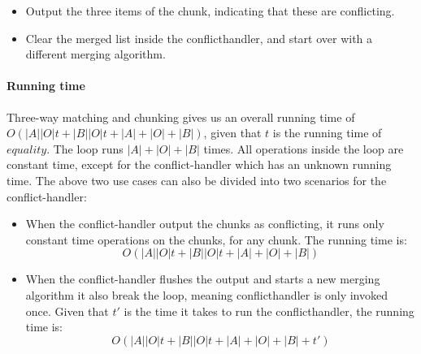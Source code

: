 \documentclass[11pt]{article}
\begin{document}
\begin{itemize}
   \item Output the three items of the chunk, indicating that these are conflicting.
   \item Clear the merged list inside the conflicthandler, and start over with a different merging algorithm.
\end{itemize}

\paragraph{Running time} Three-way matching and chunking gives us an overall running time of $O(|A||O| t + |B||O| t + |A|+|O|+|B|)$, given that $t$ is the running time of $equality$. The loop runs $|A|+|O|+|B|$ times. All operations inside the loop are constant time, except for the conflict-handler which has an unknown running time. The above two use cases can also be divided into two scenarios for the conflict-handler:

\begin{itemize}
	\item When the conflict-handler output the chunks as conflicting, it runs only constant time operations on the chunks, for any chunk. The running time is:\\
		\begin{equation}
			O(|A||O| t + |B||O| t + |A|+|O|+|B| ) \nonumber
		\end{equation}

	
	\item When the conflict-handler flushes the output and starts a new merging algorithm it also break the loop, meaning conflicthandler is only invoked once. Given that $t'$ is the time it takes to run the conflicthandler, the running time is:\\
		\begin{equation}
			O(|A||O| t + |B||O| t + |A|+|O|+|B| + t') \nonumber
		\end{equation}

\end{itemize}
\end{document}
